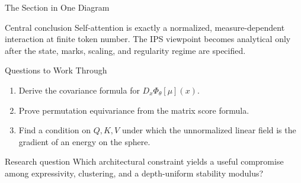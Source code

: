 \documentclass[aspectratio=169,11pt]{beamer}
\begin{document}
\begin{frame}{The Section in One Diagram}
\begin{center}
\end{center}

\begin{block}{Central conclusion}
Self-attention is exactly a normalized, measure-dependent interaction at finite token number.  The IPS viewpoint becomes analytical only after the state, marks, scaling, and regularity regime are specified.
\end{block}
\end{frame}

\begin{frame}{Questions to Work Through}
\begin{enumerate}
\item Derive the covariance formula for $D_x\Phi_\theta[\mu](x)$.
\item Prove permutation equivariance from the matrix score formula.
\item Find a condition on $Q,K,V$ under which the unnormalized linear field is the gradient of an energy on the sphere.
\end{enumerate}

\begin{exampleblock}{Research question}
Which architectural constraint yields a useful compromise among expressivity, clustering, and a depth-uniform stability modulus?
\end{exampleblock}
\end{frame}
\end{document}
